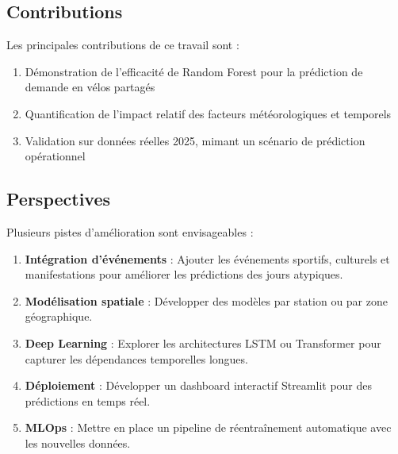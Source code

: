 \documentclass[12pt,a4paper]{article}
\begin{document}
\subsection{Contributions}

Les principales contributions de ce travail sont :

\begin{enumerate}
    \item Démonstration de l'efficacité de Random Forest pour la prédiction de demande en vélos partagés
    \item Quantification de l'impact relatif des facteurs météorologiques et temporels
    \item Validation sur données réelles 2025, mimant un scénario de prédiction opérationnel
\end{enumerate}

\subsection{Perspectives}

Plusieurs pistes d'amélioration sont envisageables :

\begin{enumerate}
    \item \textbf{Intégration d'événements} : Ajouter les événements sportifs, culturels et manifestations pour améliorer les prédictions des jours atypiques.
    
    \item \textbf{Modélisation spatiale} : Développer des modèles par station ou par zone géographique.
    
    \item \textbf{Deep Learning} : Explorer les architectures LSTM ou Transformer pour capturer les dépendances temporelles longues.
    
    \item \textbf{Déploiement} : Développer un dashboard interactif Streamlit pour des prédictions en temps réel.
    
    \item \textbf{MLOps} : Mettre en place un pipeline de réentraînement automatique avec les nouvelles données.
\end{enumerate}
\end{document}
